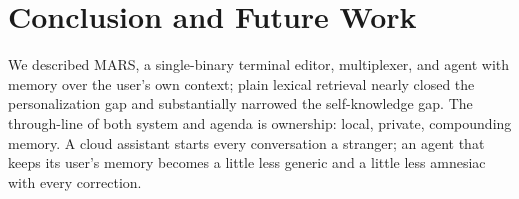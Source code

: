 \section{Conclusion and Future Work}
\label{sec:conclusion}
\label{sec:future}

We described MARS, a single-binary terminal editor, multiplexer, and agent with memory
over the user's own context; plain lexical retrieval nearly closed the personalization
gap and substantially narrowed the self-knowledge gap. The through-line of both
system and agenda is ownership: local, private, compounding memory. A cloud
assistant starts every conversation a stranger; an agent that keeps its user's memory
becomes a little less generic and a little less amnesiac with every correction.
